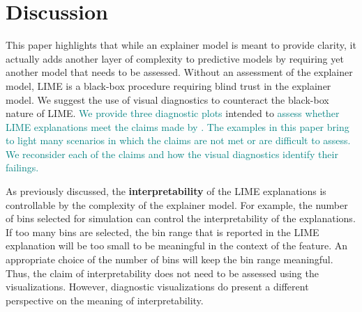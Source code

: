 \documentclass[AMS,STIX2COL]{WileyNJD-v2}\usepackage[]{graphicx}\usepackage[]{color}
\newcommand{\kge}[1]{\textcolor{teal}{#1}}
\renewcommand{\sout}[1]{\unskip}
\begin{document}
\sout{Without applying LIME with multiple tuning parameter values to the bullet test data or viewing diagnostic plots of the LIME explanations, it may be very possible to formulate reasons why the LIME explanations make sense. However, the sequence of plots in this section (Figures \ref{fig:figure-09}, \ref{fig:figure-10}, and \ref{fig:figure-11}) suggest that we should be cautious to trust any of these LIME explanations. It appears that either LIME needs to be further tuned to provide trustworthy and good explanations, or a different approach may provide better insight.}

\section{Discussion} \label{discussion}

This paper highlights that while an explainer model is meant to provide clarity, it actually adds another layer of complexity to predictive models by requiring yet another model that needs to be assessed. Without an assessment of the explainer model, LIME is a black-box procedure \sout{of its own} requiring blind trust in the explainer model. We suggest the use of visual diagnostics to counteract the black-box nature of LIME\sout{ and provide three diagnostic plots}. \kge{We provide three diagnostic plots} \sout{The \kge{plots} \sout{visualizations} are} intended to \kge{assess whether LIME explanations meet the claims made by \citet{ribeiro:2016}. The examples in this paper bring to light many scenarios in which the claims are not met or are difficult to assess. We reconsider each of the claims and how the visual diagnostics identify their failings.} \sout{provide insight on how LIME works, assess the ability of the explainer model to capture the complex predictive model, and compare LIME explanations produced by different tuning parameter values. While the visualizations accomplish these tasks, they also expose examples of the failings of LIME. To address the discovered failings of LIME, we reconsider each of the claims about the performance of LIME made by \citet{ribeiro:2016} in light of the insights gained from the diagnostic visualizations.}

As previously discussed, the \textbf{interpretability} of the LIME explanations is controllable  by the complexity of the explainer model. For example, the number of bins selected for simulation can control the interpretability of the explanations. If too many bins are selected, the bin range that is reported in the LIME explanation will be too small to be meaningful in the context of the feature. An appropriate choice of the number of bins will keep the bin range meaningful. Thus, the claim of interpretability does not need to be assessed using the visualizations. However, diagnostic visualizations do present a different perspective on the meaning of interpretability.
\end{document}
